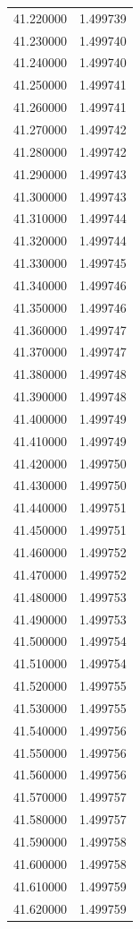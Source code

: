 \begin{tabular}{rr}
41.220000 & 1.499739 \\
41.230000 & 1.499740 \\
41.240000 & 1.499740 \\
41.250000 & 1.499741 \\
41.260000 & 1.499741 \\
41.270000 & 1.499742 \\
41.280000 & 1.499742 \\
41.290000 & 1.499743 \\
41.300000 & 1.499743 \\
41.310000 & 1.499744 \\
41.320000 & 1.499744 \\
41.330000 & 1.499745 \\
41.340000 & 1.499746 \\
41.350000 & 1.499746 \\
41.360000 & 1.499747 \\
41.370000 & 1.499747 \\
41.380000 & 1.499748 \\
41.390000 & 1.499748 \\
41.400000 & 1.499749 \\
41.410000 & 1.499749 \\
41.420000 & 1.499750 \\
41.430000 & 1.499750 \\
41.440000 & 1.499751 \\
41.450000 & 1.499751 \\
41.460000 & 1.499752 \\
41.470000 & 1.499752 \\
41.480000 & 1.499753 \\
41.490000 & 1.499753 \\
41.500000 & 1.499754 \\
41.510000 & 1.499754 \\
41.520000 & 1.499755 \\
41.530000 & 1.499755 \\
41.540000 & 1.499756 \\
41.550000 & 1.499756 \\
41.560000 & 1.499756 \\
41.570000 & 1.499757 \\
41.580000 & 1.499757 \\
41.590000 & 1.499758 \\
41.600000 & 1.499758 \\
41.610000 & 1.499759 \\
41.620000 & 1.499759 \\

\end{tabular}
